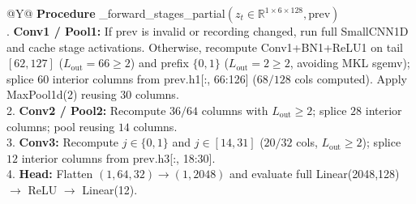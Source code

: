 \documentclass[11pt,oneside,a4paper]{report}
\newcommand{\R}{\mathbb{R}}
\newcommand{\code}[1]{{\small\upshape\ttfamily #1}}
\theoremstyle{remark}
\begin{document}
\begin{table}[htbp]
\centering\small
\caption{Algorithm 2: Stagewise Incremental Conv1D Schedule (\code{ActualK12IncrementalEngine}, \nolinkurl{incremental.py})}
\label{tab:alg_inc}
\begin{tabularx}{\textwidth}{@{}Y@{}}
\toprule
\textbf{Procedure} \code{\_forward\_stages\_partial}$(z_t \in \R^{1\times 6\times 128}, \text{prev})$ \\
. \textbf{Conv1 / Pool1:} If \code{prev} is invalid or recording changed, run full \code{SmallCNN1D} and cache stage activations. Otherwise, recompute \code{Conv1+BN1+ReLU1} on tail $[62,127]$ ($L_{\text{out}}=66 \ge 2$) and prefix $\{0,1\}$ ($L_{\text{out}}=2 \ge 2$, avoiding MKL \code{sgemv}); splice $60$ interior columns from \code{prev.h1[:, 66:126]} ($68/128$ cols computed). Apply \code{MaxPool1d(2)} reusing $30$ columns. \\
2. \textbf{Conv2 / Pool2:} Recompute $36/64$ columns with $L_{\text{out}} \ge 2$; splice $28$ interior columns; pool reusing $14$ columns. \\
3. \textbf{Conv3:} Recompute $j \in \{0,1\}$ and $j \in [14,31]$ ($20/32$ cols, $L_{\text{out}} \ge 2$); splice $12$ interior columns from \code{prev.h3[:, 18:30]}. \\
4. \textbf{Head:} Flatten $(1, 64, 32) \to (1, 2048)$ and evaluate full \code{Linear(2048,128)} $\to$ \code{ReLU} $\to$ \code{Linear(12)}. \\
\bottomrule
\end{tabularx}
\end{table}
\end{document}
